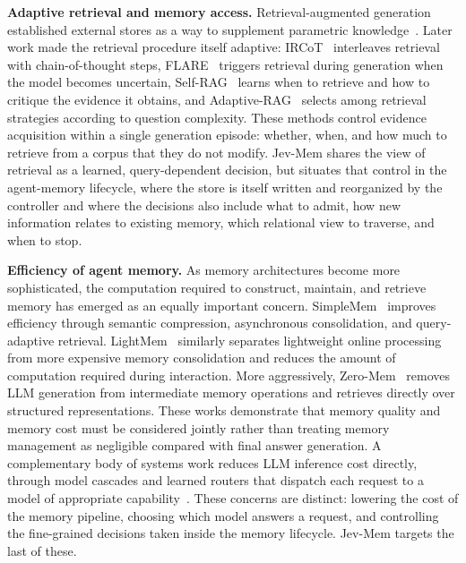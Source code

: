 \documentclass[11pt]{article}
\begin{document}
\noindent\textbf{Adaptive retrieval and memory access.}
Retrieval-augmented generation established external stores as a way to supplement parametric knowledge~\citep{lewis2020retrieval, guu2020realm, izacard2023atlas}. Later work made the retrieval procedure itself adaptive: IRCoT~\citep{trivedi2023ircot} interleaves retrieval with chain-of-thought steps, FLARE~\citep{jiang2023flare} triggers retrieval during generation when the model becomes uncertain, Self-RAG~\citep{asai2024selfrag} learns when to retrieve and how to critique the evidence it obtains, and Adaptive-RAG~\citep{jeong2024adaptiverag} selects among retrieval strategies according to question complexity. These methods control evidence acquisition within a single generation episode: whether, when, and how much to retrieve from a corpus that they do not modify. Jev-Mem shares the view of retrieval as a learned, query-dependent decision, but situates that control in the agent-memory lifecycle, where the store is itself written and reorganized by the controller and where the decisions also include what to admit, how new information relates to existing memory, which relational view to traverse, and when to stop.

\noindent\textbf{Efficiency of agent memory.}
As memory architectures become more sophisticated, the computation required to construct, maintain, and retrieve memory has emerged as an equally important concern. SimpleMem~\citep{liu2026simplemem} improves efficiency through semantic compression, asynchronous consolidation, and query-adaptive retrieval. LightMem~\citep{fang2026lightmem} similarly separates lightweight online processing from more expensive memory consolidation and reduces the amount of computation required during interaction. More aggressively, Zero-Mem~\citep{xiao2026zero} removes LLM generation from intermediate memory operations and retrieves directly over structured representations. These works demonstrate that memory quality and memory cost must be considered jointly rather than treating memory management as negligible compared with final answer generation. A complementary body of systems work reduces LLM inference cost directly, through model cascades and learned routers that dispatch each request to a model of appropriate capability~\citep{chen2023frugalgpt, ong2024routellm}. These concerns are distinct: lowering the cost of the memory pipeline, choosing which model answers a request, and controlling the fine-grained decisions taken inside the memory lifecycle. Jev-Mem targets the last of these.
\end{document}
